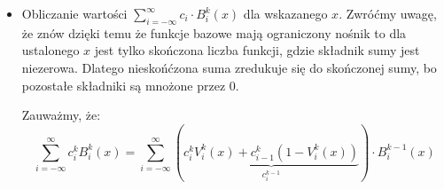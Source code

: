 \documentclass[hidelinks,a4paper,fleqn,oneside]{book}
\begin{document}
\begin{itemize}
\begin{proof}
	Więc ich kombinacja liniowa równa się $0$ dla $x \not\in (x_i, x_{i+k+1})$.
	\end{proof}
	
	\item Obliczanie wartości $\sum_{i=-\infty}^{\infty} c_i \cdot B_i^k(x)$ dla wskazanego $x$. Zwróćmy uwagę, że znów dzięki temu że funkcje bazowe mają ograniczony nośnik to dla ustalonego $x$ jest tylko skończona liczba funkcji, gdzie składnik sumy jest niezerowa. Dlatego nieskońćzona suma zredukuje się do skończonej sumy, bo pozostałe składniki są mnożone przez $0$.
	
	Zauważmy, że:
	\[
		\sum_{i=-\infty}^{\infty} c_i^k B_i^k(x) = \sum_{i=-\infty}^{\infty}(\underbrace{c_i^k V_i^k(x) + c_{i-1}^k(1-V_i^k(x))}_{c_i^{k-1}}) \cdot B_i^{k-1}(x)
	\]
\end{itemize}
\end{document}
